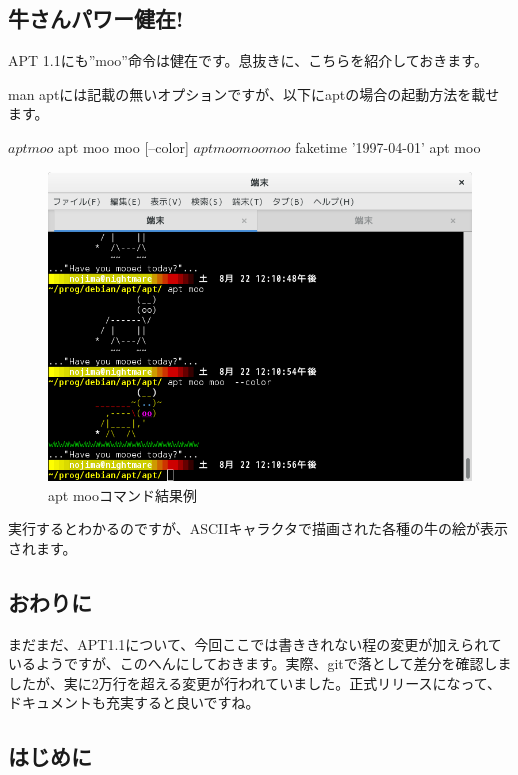 \documentclass[mingoth,a4paper]{jsarticle}
\begin{document}
\subsection{牛さんパワー健在!}

 APT 1.1にも''moo''命令は健在です。息抜きに、こちらを紹介しておきます。

 man aptには記載の無いオプションですが、以下にaptの場合の起動方法を載せます。

\begin{commandline}  
$ apt moo 
$ apt moo moo [--color]
$ apt moo moo moo  
$ faketime '1997-04-01' apt moo
\end{commandline}    

\begin{figure}[H]
\begin{center}
 \includegraphics[width=0.7\hsize]{image201508/apt-moo.png}
\end{center}
\caption{apt mooコマンド結果例}
\end{figure}

 実行するとわかるのですが、ASCIIキャラクタで描画された各種の牛の絵が表示されます。

\subsection{おわりに}

 まだまだ、APT1.1について、今回ここでは書ききれない程の変更が加えられているようですが、このへんにしておきます。実際、gitで落として差分を確認しましたが、実に2万行を超える変更が行われていました。正式リリースになって、ドキュメントも充実すると良いですね。
   
 \subsection{はじめに}
\end{document}
